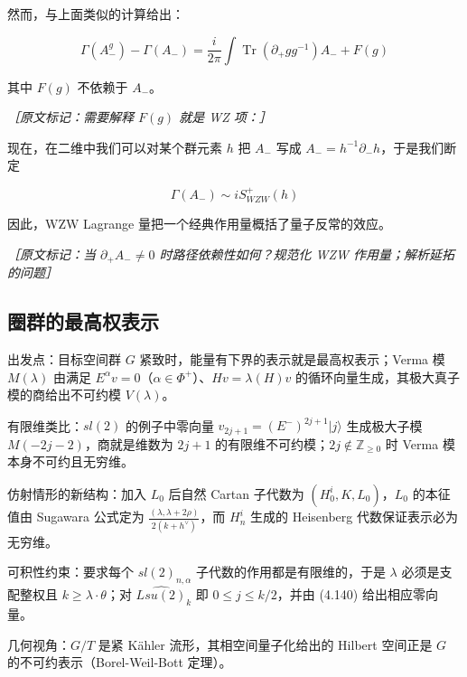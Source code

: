 然而，与上面类似的计算给出：

\begin{equation}
  \Gamma(A^g_-)-\Gamma(A_-)=\frac{i}{2\pi}\int\operatorname{Tr}(\partial_+gg^{-1})A_-+F(g)
  \tag{4.113}
  \label{eq:4.113}
\end{equation}

其中 $F(g)$ 不依赖于 $A_-$。

{\small\itshape ［原文标记：需要解释 $F(g)$ 就是 WZ 项：］}

现在，在二维中我们可以对某个群元素 $h$ 把 $A_-$ 写成 $A_-=h^{-1}\partial_-h$，于是我们断定

\begin{equation}
  \Gamma(A_-)\sim iS^+_{WZW}(h)
  \tag{4.114}
  \label{eq:4.114}
\end{equation}

因此，WZW Lagrange 量把一个经典作用量概括了量子反常的效应。

{\small\itshape ［原文标记：当 $\partial_+A_-\neq0$ 时路径依赖性如何？规范化 WZW 作用量；解析延拓的问题］}

\subsection{圈群的最高权表示} %

\begin{keytakeaways}
  \item 出发点：目标空间群 $G$ 紧致时，能量有下界的表示就是最高权表示；Verma 模 $M(\lambda)$ 由满足 $E^\alpha v=0$（$\alpha\in\Phi^+$）、$Hv=\lambda(H)v$ 的循环向量生成，其极大真子模的商给出不可约模 $V(\lambda)$。
  \item 有限维类比：$sl(2)$ 的例子中零向量 $v_{2j+1}=(E^-)^{2j+1}|j\rangle$ 生成极大子模 $M(-2j-2)$，商就是维数为 $2j+1$ 的有限维不可约模；$2j\notin\mathbb{Z}_{\geq0}$ 时 Verma 模本身不可约且无穷维。
  \item 仿射情形的新结构：加入 $L_0$ 后自然 Cartan 子代数为 $(H^i_0,K,L_0)$，$L_0$ 的本征值由 Sugawara 公式定为 $\frac{(\lambda,\lambda+2\rho)}{2(k+h^\vee)}$，而 $H^i_n$ 生成的 Heisenberg 代数保证表示必为无穷维。
  \item 可积性约束：要求每个 $sl(2)_{n,\alpha}$ 子代数的作用都是有限维的，于是 $\lambda$ 必须是支配整权且 $k\ge\lambda\cdot\theta$；对 $\widehat{Lsu(2)}_k$ 即 $0\le j\le k/2$，并由 (4.140) 给出相应零向量。
  \item 几何视角：$G/T$ 是紧 Kähler 流形，其相空间量子化给出的 Hilbert 空间正是 $G$ 的不可约表示（Borel-Weil-Bott 定理）。
\end{keytakeaways}

